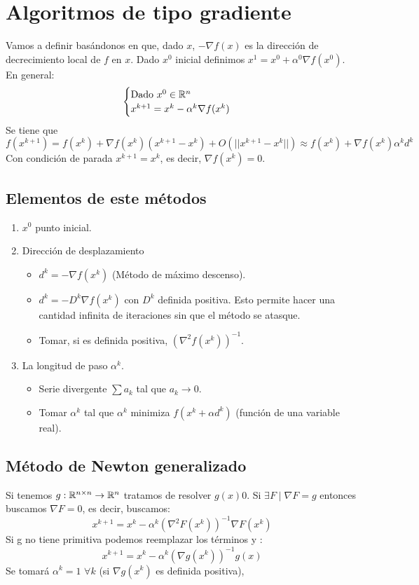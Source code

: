 \documentclass[PM.tex]{subfiles}
\begin{document}
\section{Algoritmos de tipo gradiente}
Vamos a definir basándonos en que, dado $x$, $-\nabla f(x)$ es la dirección de decrecimiento local de $f$ en $x$. Dado $x^0$ inicial definimos $x^1 = x^0 + \alpha^0\nabla f(x^0)$. En general:
\[
\begin{cases}
\text{Dado $x^0\in \mathbb{R}^n$}\\
x^{k+1} = x^k - \alpha^k \nabla f(x^k)
\end{cases}
\]
Se tiene que
\[
f(x^{k+1})=f(x^k)+\nabla f(x^k)(x^{k+1}-x^k) + O(||x^{k+1}-x^k||) \approx f(x^k)+\nabla f(x^k)\alpha^k d^k
\]
Con condición de parada $x^{k+1}=x^k$, es decir, $\nabla f(x^k)=0$.
\newpage
\subsection{Elementos de este métodos}
\begin{enumerate}
\item $x^0$ punto inicial.
\item Dirección de desplazamiento
\begin{itemize}
\item $d^k = -\nabla f(x^k)$ (Método de máximo descenso).
\item $d^k = -D^k \nabla f(x^k)$ con $D^k$ definida positiva. Esto permite hacer una cantidad infinita de iteraciones sin que el método se atasque.
\item Tomar, si es definida positiva, $(\nabla^2 f(x^k))^{-1}$.
\end{itemize}
\item La longitud de paso $\alpha^k$.
\begin{itemize}
\item Serie divergente $\sum a_k$ tal que $a_k \rightarrow 0$.
\item Tomar $\alpha^k$ tal que $\alpha^k$ minimiza $f(x^k+\alpha d^k)$ (función de una variable real).
\end{itemize}
\end{enumerate}
\subsection{Método de Newton generalizado}
Si tenemos $g:\mathbb{R}^{n\times n}\to \mathbb{R}^n$ tratamos de resolver $g(x)0$. Si $\exists F\mid \nabla F = g$ entonces buscamos $\nabla F =0$, es decir, buscamos:
\[
x^{k+1} =x^k - \alpha^k (\nabla^2 F(x^k))^{-1}\nabla F(x^k)
\]
Si g no tiene primitiva podemos reemplazar los términos y :
\[
x^{k+1}=x^k-\alpha^k(\nabla g(x^k))^{-1} g(x)
\]
Se tomará $\alpha^k =1$ $\forall k$ (si $\nabla g(x^k)$ es definida positiva),
\end{document}

